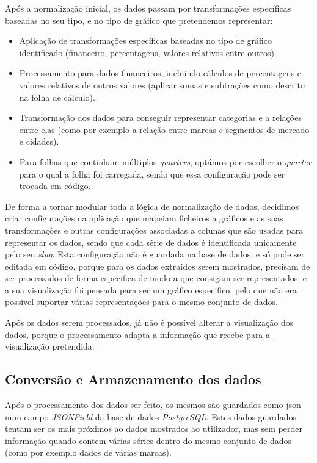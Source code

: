 Após a normalização inicial, os dados passam por transformações específicas baseadas no seu tipo, e no tipo de gráfico que pretendemos representar:

\begin{itemize}
    \item Aplicação de transformações específicas baseadas no tipo de gráfico identificado (financeiro, percentagens, valores relativos entre outros).
    \item Processamento para dados financeiros, incluindo cálculos de percentagens e valores relativos de outros valores (aplicar somas e subtrações como descrito na folha de cálculo).
    \item Transformação dos dados para conseguir representar categorias e a relações entre elas (como por exemplo a relação entre marcas e segmentos de mercado e cidades).
    \item Para folhas que continham múltiplos \textit{quarters}, optámos por escolher o \textit{quarter} para o qual a folha foi carregada, sendo que essa configuração pode ser trocada em código.
\end{itemize}

De forma a tornar modular toda a lógica de normalização de dados, decidimos criar configurações na aplicação que mapeiam ficheiros a gráficos e as suas transformações e outras configurações associadas a colunas que são usadas para representar os dados, sendo que cada série de dados é identificada unicamente pelo seu \textit{slug}. Esta configuração não é guardada na base de dados, e só pode ser editada em código, porque para os dados extraídos serem mostrados, precisam de ser processados de forma especifica de modo a que consigam ser representados, e a sua visualização foi pensada para ser um gráfico especifico, pelo que não era possível suportar várias representações para o mesmo conjunto de dados. 

Após os dados serem processados, já não é possível alterar a visualização dos dados, porque o processamento adapta a informação que recebe para a visualização pretendida.

\subsection{Conversão e Armazenamento dos dados}
\label{sec:armazenamentoDados}

Após o processamento dos dados ser feito, os mesmos são guardados como \gls{json} num campo \textit{JSONField} da base de dados \textit{PostgreSQL}. Estes dados guardados tentam ser os mais próximos ao dados mostrados ao utilizador, mas sem perder informação quando contem várias séries dentro do mesmo conjunto de dados (como por exemplo dados de várias marcas).

